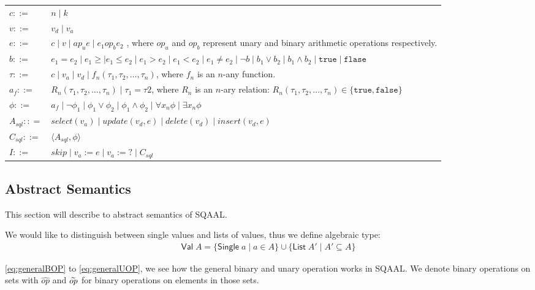 \begin{center}
    \begin{tabular}{l l}
        $c ::=$ & $n \mid k$ \\
        $v ::=$ & $v_d \mid v_a$ \\
        $e ::=$ & $c \mid v \mid ap_u e \mid e_1 op_b e_2$ , where $op_u$ and $op_b$ represent unary and binary arithmetic operations respectively. \\
        $b ::=$ & $e_1 = e_2 \mid e_1 \geq \mid e_1 \leq e_2 \mid e_1 > e_2 \mid e_1 < e_2 \mid e_1 \neq e_2 \mid \neg b \mid b_1 \lor b_2 \mid b_1 \land b_2 \mid \texttt{true} \mid \texttt{flase}$ \\
        $\tau ::=$ & $c \mid v_a \mid v_d \mid f_n(\tau_1, \tau_2, \dots, \tau_n)$, where $f_n$ is an $n$-any function. \\
        $a_f ::=$ & $R_n(\tau_1, \tau_2, \dots, \tau_n) \mid \tau_1 = \tau2$, where $R_n$ is an $n$-ary relation: $R_n(\tau_1, \tau_2, \dots, \tau_n) \in \{ \texttt{true}, \texttt{false}\}$ \\
        $\phi ::=$ & $a_f \mid \neg \phi_1 \mid \phi_1 \lor \phi_2 \mid \phi_1 \land \phi_2 \mid \forall x_n \phi \mid \exists x_n \phi$ \\
        $A_{sql} :: =$ & $select(v_a) \mid update(v_d, e) \mid delete(v_d) \mid insert(v_d, e)$ \\
        $C_{sql} ::=$ & $\langle A_{sql}, \phi \rangle $ \\
        $I ::=$ & $skip \mid v_a := e \mid v_a := ? \mid C_{sql} $\\
    \end{tabular}
\end{center}


\subsection{Abstract Semantics}\label{subsec:abstract-semantics}
This section will describe to abstract semantics of SQAAL.

We would like to distinguish between single values and lists of values, thus we define algebraic type:
\begin{align}
    \mathsf{Val} \; A = \{ \mathsf{Single} \; a \mid a \in A \} \cup \{ \mathsf{List} \; A' \mid A' \subseteq A \}
\end{align}

\autoref{eq:generalBOP} to \ref{eq:generalUOP}, we see how the general binary and unary operation works in SQAAL.
We denote binary operations on sets with $\widehat{op}$ and $\widetilde{op}$ for binary operations on elements in those sets.

